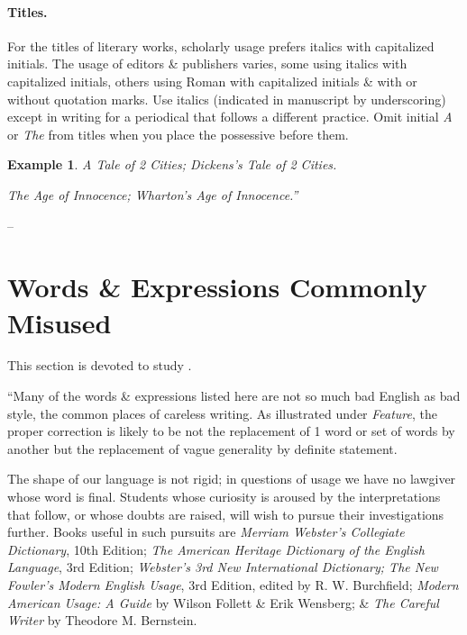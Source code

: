 \documentclass[oneside]{book}
\numberwithin{equation}{section}
\newtheorem{example}{Example}[chapter]
\begin{document}
\paragraph*{Titles.} For the titles of literary works, scholarly usage prefers italics with capitalized initials. The usage of editors \& publishers varies, some using italics with capitalized initials, others using Roman with capitalized initials \& with or without quotation marks. Use italics (indicated in manuscript by underscoring) except in writing for a periodical that follows a different practice. Omit initial \textit{A} or \textit{The} from titles when you place the possessive before them.

\begin{example}
	A Tale of 2 Cities; \emph{Dickens's} Tale of 2 Cities.
	
	The Age of Innocence; \emph{Wharton's} Age of Innocence.''
\end{example}
-- \cite[Chap. 3, pp. 50--53]{Strunk_White2019}

\section{Words \& Expressions Commonly Misused}
This section is devoted to study \cite[Chap. 4]{Strunk_White2019}.

``Many of the words \& expressions listed here are not so much bad English as bad style, the common places of careless writing. As illustrated under \textit{Feature}, the proper correction is likely to be not the replacement of 1 word or set of words by another but the replacement of vague generality by definite statement.

The shape of our language is not rigid; in questions of usage we have no lawgiver whose word is final. Students whose curiosity is aroused by the interpretations that follow, or whose doubts are raised, will wish to pursue their investigations further. Books useful in such pursuits are \textit{Merriam Webster's Collegiate Dictionary}, 10th Edition; \textit{The American Heritage Dictionary of the English Language}, 3rd Edition; \textit{Webster's 3rd New International Dictionary; The New Fowler's Modern English Usage}, 3rd Edition, edited by R. W. Burchfield; \textit{Modern American Usage: A Guide} by Wilson Follett \& Erik Wensberg; \& \textit{The Careful Writer} by Theodore M. Bernstein.
\end{document}
